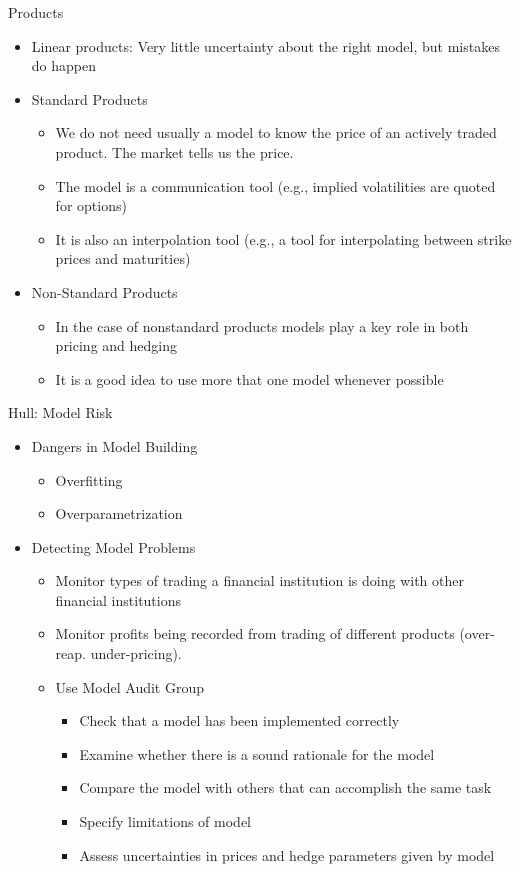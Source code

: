 {Products}
\begin{itemize}
\item<1-> Linear products: Very little uncertainty about the right model, but mistakes do happen
\item<2-> Standard Products
\begin{itemize}
\item We do not need usually a model to know the price of an actively traded product. The market tells us the price.
\item The model is a communication tool (e.g., implied volatilities are quoted for options)
\item It is also an interpolation tool (e.g., a tool for interpolating between strike prices and maturities)
\end{itemize}
\item<3-> Non-Standard Products
\begin{itemize}
\item In the case of nonstandard products models play a key role in both pricing and hedging
\item It is a good idea to use more that one model whenever possible
\end{itemize}
\end{itemize}


{Hull: Model Risk}
\begin{itemize}
\item<1->  Dangers in Model Building
\begin{itemize}
\item Overfitting
\item Overparametrization
\end{itemize}
\item<2-> Detecting Model Problems
\begin{itemize}
\item<1-> Monitor types of trading a financial institution is doing with other financial institutions
\item<2-> Monitor profits being recorded from trading of different products (over- reap. under-pricing).
\item<3-> Use Model Audit Group
\begin{itemize}
\item Check that a model has been implemented correctly
\item Examine whether there is a sound rationale for the model
\item Compare the model with others that can accomplish the same task
\item Specify limitations of model
\item Assess uncertainties in prices and hedge parameters given by model
\end{itemize}
\end{itemize}
\end{itemize}


